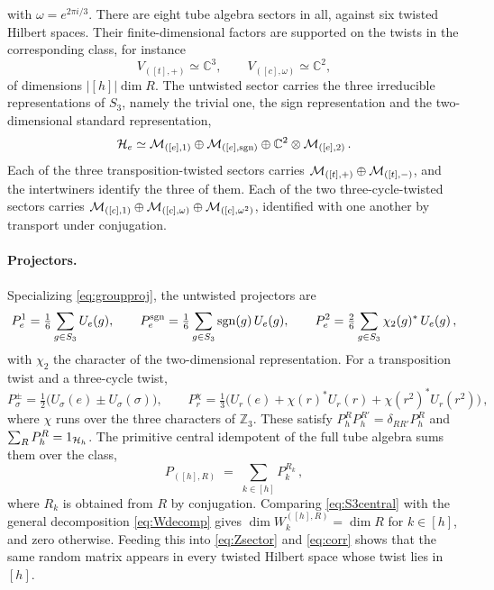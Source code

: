 \documentclass[11pt]{article}
\numberwithin{equation}{section}
\begin{document}
\noindent
with $\omega = e^{2\pi i/3}$. There are eight tube algebra sectors in all, against six twisted Hilbert
spaces. Their finite-dimensional factors are
supported on the twists in the corresponding class, for instance
\begin{equation}
  V_{([t],+)} \simeq \mathbb{C}^3 , \qquad V_{([c],\omega)} \simeq \mathbb{C}^2 ,
  \label{eq:S3V}
\end{equation}
of dimensions $|[h]| \dim R$. The untwisted sector carries the three irreducible representations
of $S_3$, namely the trivial one, the sign representation and the two-dimensional standard
representation,
\begin{equation}
  \mathcal{H}_e \simeq \mathcal{M}_{([e],1)} \oplus \mathcal{M}_{([e],\mathrm{sgn})} \oplus \mathbb{C}^2 \otimes \mathcal{M}_{([e],2)} \,.
  \label{eq:S3untwisted}
\end{equation}
Each of the three transposition-twisted sectors carries
$\mathcal{M}_{([t],+)} \oplus \mathcal{M}_{([t],-)}$, and the intertwiners identify the three of them. Each of
the two three-cycle-twisted sectors carries
$\mathcal{M}_{([c],1)} \oplus \mathcal{M}_{([c],\omega)} \oplus \mathcal{M}_{([c],\omega^2)}$, identified with one
another by transport under conjugation.

\paragraph{Projectors.}

Specializing \eqref{eq:groupproj}, the untwisted projectors are
\begin{equation}
  P^1_e = \tfrac{1}{6} \sum_{g \in S_3} U_e(g), \qquad
  P^{\mathrm{sgn}}_e = \tfrac{1}{6} \sum_{g \in S_3} \mathrm{sgn}(g)\, U_e(g), \qquad
  P^2_e = \tfrac{2}{6} \sum_{g \in S_3} \chi_2(g)^*\, U_e(g) \,,
  \label{eq:S3projuntwisted}
\end{equation}
with $\chi_2$ the character of the two-dimensional representation. For a transposition twist and a
three-cycle twist,
\begin{equation}
  P^\pm_\sigma = \tfrac{1}{2}\big( U_\sigma(e) \pm U_\sigma(\sigma) \big), \qquad
  P^{\chi}_r = \tfrac{1}{3}\big( U_r(e) + \chi(r)^* U_r(r) + \chi(r^2)^* U_r(r^2) \big) \,,
  \label{eq:S3projtwisted}
\end{equation}
where $\chi$ runs over the three characters of $\mathbb{Z}_3$. These satisfy
$P^R_h P^{R'}_h = \delta_{RR'} P^R_h$ and $\sum_R P^R_h = 1_{\mathcal{H}_h}$. The
primitive central idempotent of the full tube algebra sums them over the class,
\begin{equation}
  P_{([h],R)} \;=\; \sum_{k \in [h]} P^{R_k}_k \,,
  \label{eq:S3central}
\end{equation}
where $R_k$ is obtained from $R$ by conjugation. Comparing \eqref{eq:S3central} with the general
decomposition \eqref{eq:Wdecomp} gives $\dim W^{([h],R)}_k = \dim R$ for $k \in [h]$, and zero
otherwise. Feeding this into \eqref{eq:Zsector} and \eqref{eq:corr} shows that the same random
matrix appears in every twisted Hilbert space whose twist lies in $[h]$.
\end{document}
